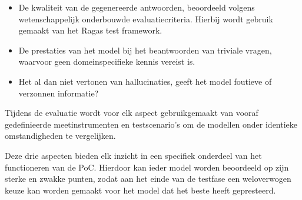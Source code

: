 \begin{itemize}
    \item De kwaliteit van de gegenereerde antwoorden, beoordeeld volgens wetenschappelijk onderbouwde evaluatiecriteria. Hierbij wordt gebruik gemaakt van het Ragas test framework.
    \item De prestaties van het model bij het beantwoorden van triviale vragen, waarvoor geen domeinspecifieke kennis vereist is.
    \item Het al dan niet vertonen van hallucinaties, geeft het model foutieve of verzonnen informatie?
\end{itemize}

Tijdens de evaluatie wordt voor elk aspect gebruikgemaakt van vooraf gedefinieerde meetinstrumenten en testscenario’s om de modellen onder identieke omstandigheden te vergelijken.

Deze drie aspecten bieden elk inzicht in een specifiek onderdeel van het functioneren van de PoC. Hierdoor kan ieder model worden beoordeeld op zijn sterke en zwakke punten, zodat aan het einde van de testfase een weloverwogen keuze kan worden gemaakt voor het model dat het beste heeft gepresteerd.

